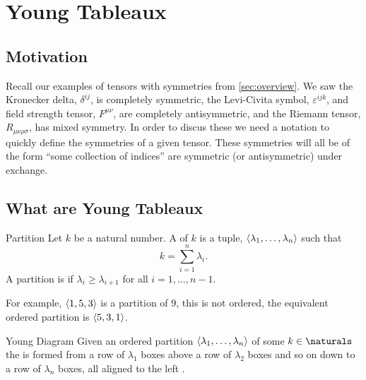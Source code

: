 \documentclass[fleqn]{NotesClass}
\DeclarePairedDelimiter{\tuple}{\langle}{\rangle}
\begin{document}
    \chapter{Young Tableaux}
    \section{Motivation}
    Recall our examples of tensors with symmetries from \cref{sec:overview}.
    We saw the Kronecker delta, \(\delta^{ij}\), is completely symmetric, the Levi-Civita symbol, \(\varepsilon^{ijk}\), and field strength tensor, \(F^{\mu\nu}\), are completely antisymmetric, and the Riemann tensor, \(R_{\mu\nu\rho\sigma}\), has mixed symmetry.
    In order to discus these we need a notation to quickly define the symmetries of a given tensor.
    These symmetries will all be of the form \enquote{some collection of indices} are symmetric (or antisymmetric) under exchange.
    
    \section{What are Young Tableaux}
    \begin{dfn}{Partition}{}
        Let \(k\) be a natural number.
        A  of \(k\) is a tuple, \(\tuple{\lambda_1, \dotsc, \lambda_n}\) such that \cite[720]{hassani}
        \begin{equation}
            k = \sum_{i = 1}^{n} \lambda_i.
        \end{equation}
        A partition is  if \(\lambda_i \ge \lambda_{i+1}\) for all \(i = 1, \dotsc, n - 1\).
    \end{dfn}

    For example, \(\tuple{1,5,3}\) is a partition of 9, this is not ordered, the equivalent ordered partition is \(\tuple{5,3,1}\).
    
    \begin{dfn}{Young Diagram}{}
        Given an ordered partition \(\tuple{\lambda_1, \dotsc, \lambda_n}\) of some \(k \in \naturals\) the  is formed from a row of \(\lambda_1\) boxes above a row of \(\lambda_2\) boxes and so on down to a row of \(\lambda_n\) boxes, all aligned to the left \cite[87]{cvitanovic}.
    \end{dfn}
    
\end{document}
